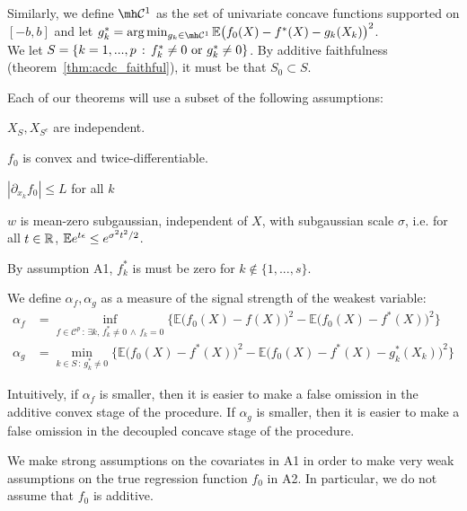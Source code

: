 Similarly, we define $\mh \mathcal{C}^1$ as the set of univariate concave functions supported on $[-b, b]$ and let 
$g^*_k = \arg\min_{g_k \in \mh \mathcal{C}^1} \E \big( f_0(X) - f^*(X) - g_k(X_k) \big)^2$. \\

We let $S = \{ k = 1,...,p \,:\, f^*_k \neq 0 \textrm{ or } g^*_k \neq 0\}$. By additive faithfulness (theorem~\ref{thm:acdc_faithful}), it must be that $S_0 \subset S$. 


Each of our theorems will use a subset of the following assumptions:
\begin{packed_enum}
\item[A1:] $X_S, X_{S^c}$ are independent. 
\item[A2:] $f_0$ is convex and twice-differentiable. 
\item[A3:] $|\partial_{x_k} f_0 | \leq L$ for all $k$
\item[A4:] $w$ is mean-zero subgaussian, independent of $X$, with subgaussian scale $\sigma$, i.e. for all $t \in {\mathbb R}$, ${\mathbb E} e^{t \epsilon} \leq e^{\sigma^2 t^2 / 2}$.
\end{packed_enum}
By assumption A1, $f^*_k$ is must be zero for $k\notin \{1,...,s\}$. 


We define $\alpha_f, \alpha_g$ as a measure of the signal strength of the weakest variable:
\begin{align*}
\alpha_f &= \inf_{f \in \mathcal{C}^p \,:\, \exists k ,\, f^*_k \neq 0 \,\wedge\, f_k = 0} 
       \Big\{ \mathbb{E} \big( f_0(X) - f(X) \big)^2 - 
        \mathbb{E} \big( f_0(X) - f^*(X) \big)^2  \Big\}\\
\alpha_g &=   \min_{k \in S \,:\, g^*_k \neq 0}
      \Big\{ \mathbb{E} \big( f_0(X) - f^*(X) \big)^2 - 
    \mathbb{E} \big( f_0(X) - f^*(X) - g^*_k(X_k) \big)^2 \Big\}
\end{align*}

Intuitively, if $\alpha_f$ is smaller, then it is easier to make a false omission in the additive convex stage of the procedure. If $\alpha_g$ is smaller, then it is easier to make a false omission in the decoupled concave stage of the procedure.

\begin{remark}
  We make strong assumptions on the covariates in A1 in order to make
  very weak assumptions on the true regression function $f_0$ in
  A2. In particular, we do not assume that $f_0$ is additive. 
\end{remark}


